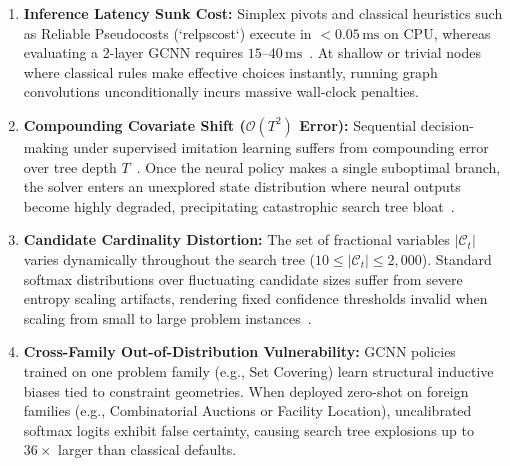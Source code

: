 \documentclass[10pt,twocolumn,letterpaper]{article}
\theoremstyle{plain}
\theoremstyle{definition}
\theoremstyle{remark}
\begin{document}
\begin{enumerate}
    \item \textbf{Inference Latency Sunk Cost:} Simplex pivots and classical heuristics such as Reliable Pseudocosts (`relpscost`) execute in $<0.05\,\text{ms}$ on CPU, whereas evaluating a 2-layer GCNN requires $15\text{--}40\,\text{ms}$~\cite{gasse2019exact,nair2020solving}. At shallow or trivial nodes where classical rules make effective choices instantly, running graph convolutions unconditionally incurs massive wall-clock penalties.
    \item \textbf{Compounding Covariate Shift ($\mathcal{O}(T^2)$ Error):} Sequential decision-making under supervised imitation learning suffers from compounding error over tree depth $T$~\cite{ross2011reduction,scavuzzo2022learning}. Once the neural policy makes a single suboptimal branch, the solver enters an unexplored state distribution where neural outputs become highly degraded, precipitating catastrophic search tree bloat~\cite{bengio2021machine,gupta2022lookback}.
    \item \textbf{Candidate Cardinality Distortion:} The set of fractional variables $|\mathcal{C}_t|$ varies dynamically throughout the search tree ($10 \le |\mathcal{C}_t| \le 2,000$). Standard softmax distributions over fluctuating candidate sizes suffer from severe entropy scaling artifacts, rendering fixed confidence thresholds invalid when scaling from small to large problem instances~\cite{guo2017calibration}.
    \item \textbf{Cross-Family Out-of-Distribution Vulnerability:} GCNN policies trained on one problem family (e.g., Set Covering) learn structural inductive biases tied to constraint geometries. When deployed zero-shot on foreign families (e.g., Combinatorial Auctions or Facility Location), uncalibrated softmax logits exhibit false certainty, causing search tree explosions up to $36\times$ larger than classical defaults.
\end{enumerate}
\end{document}
